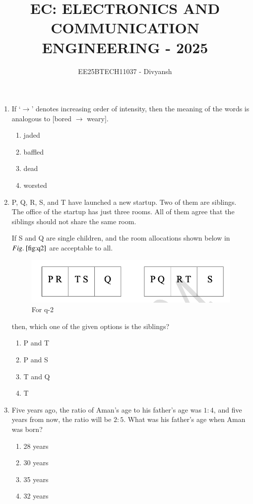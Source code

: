 \documentclass[journal,12pt,onecolumn]{IEEEtran}
\title{EC: ELECTRONICS AND COMMUNICATION ENGINEERING - 2025}
\author{EE25BTECH11037 - Divyansh}
\theoremstyle{remark}
\begin{document}
\maketitle
\begin{enumerate}

\item If `$\rightarrow$' denotes increasing order of intensity, then the meaning of the words  is analogous to [bored $\rightarrow$ weary].
\hfill{}
\begin{multicols}{4}
    \begin{enumerate}
    \item jaded
    \item baffled
    \item dead
    \item worsted
\end{enumerate}
\end{multicols}

\item P, Q, R, S, and T have launched a new startup. Two of them are siblings. The office of the startup has just three rooms. All of them agree that the siblings should not share the same room. 

If S and Q are single children, and the room allocations shown below in $\figref{fig:q2}$ are acceptable to all.
\begin{figure}[H]
    \centering
    \includegraphics[width=0.5\columnwidth]{q2.png}
    \caption{For q-2}
    \label{fig:q2}
\end{figure}
then, which one of the given options is the siblings?
\hfill{}
\begin{multicols}{4}
\begin{enumerate}
    \item P and T
    \item P and S
    \item T and Q
    \item T
\end{enumerate}
\end{multicols}

\item Five years ago, the ratio of Aman's age to his father's age was $1\colon4$, and five years from now, the ratio will be $2\colon5$. What was his father's age when Aman was born?
\hfill{}
\begin{multicols}{4}
\begin{enumerate}
    \item 28 years
    \item 30 years
    \item 35 years
    \item 32 years
\end{enumerate}
\end{multicols}


\end{enumerate}
\end{document}
